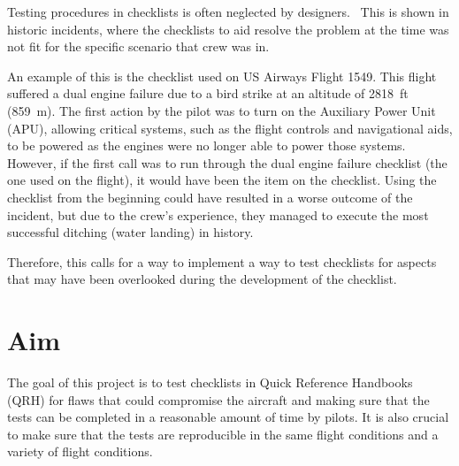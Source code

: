 \documentclass[../dissertation.tex]{subfiles}
\begin{document}
Testing procedures in checklists is often neglected by designers.~\cite{nasa:design}
This is shown in historic incidents, where the checklists to aid resolve the problem
at the time was not fit for the specific scenario that crew was in.

An example of this is the checklist used on US Airways Flight 1549. This flight
suffered a dual engine failure due to a bird strike at an altitude of \qty{2818}{ft} (\qty{859}{\meter}).
The first action by the pilot was to turn on the Auxiliary Power Unit (APU), allowing
critical systems, such as the flight controls and navigational aids, to be powered as
the engines were no longer able to power those systems. However, if the first call
was to run through the dual engine failure checklist (the one used on the flight),
it would have been the  item on the checklist.
Using the checklist from the beginning could have resulted in a worse outcome of the incident,
but due to the crew's experience, they managed to execute the most successful
ditching (water landing) in history.~\cite{ntsb:AWE1549}

Therefore, this calls for a way to implement a way to test checklists for aspects
that may have been overlooked during the development of the checklist.

\section{Aim}
The goal of this project is to test checklists in Quick Reference Handbooks (QRH)
for flaws that could compromise the aircraft and making sure that the tests can
be completed in a reasonable amount of time by pilots. It is also crucial to make
sure that the tests are reproducible in the same flight conditions and a variety of
flight conditions.
\end{document}
